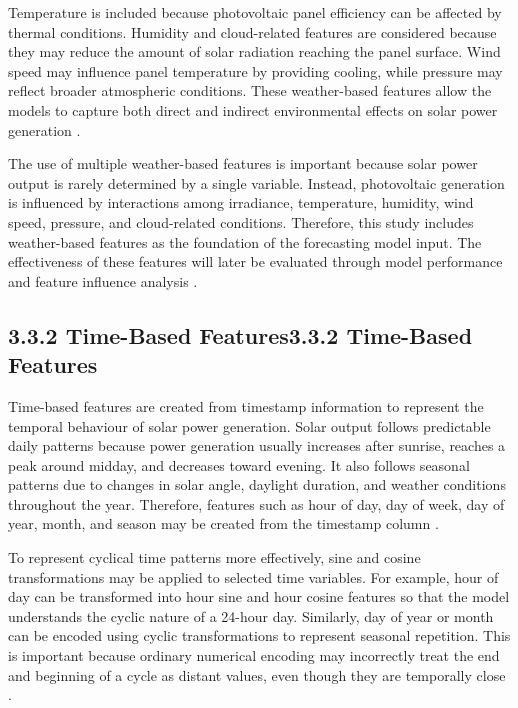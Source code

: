 Temperature is included because photovoltaic panel efficiency can be affected by thermal conditions. Humidity and cloud-related features are considered because they may reduce the amount of solar radiation reaching the panel surface. Wind speed may influence panel temperature by providing cooling, while pressure may reflect broader atmospheric conditions. These weather-based features allow the models to capture both direct and indirect environmental effects on solar power generation \parencite{Eren2025, Alhassan2025, Duvuru2026}.

The use of multiple weather-based features is important because solar power output is rarely determined by a single variable. Instead, photovoltaic generation is influenced by interactions among irradiance, temperature, humidity, wind speed, pressure, and cloud-related conditions. Therefore, this study includes weather-based features as the foundation of the forecasting model input. The effectiveness of these features will later be evaluated through model performance and feature influence analysis \parencite{JnanaVarshitha2025, Bakht2025, Pongphaw2025}.

\subsection{3.3.2 Time-Based Features3.3.2 Time-Based Features}

Time-based features are created from timestamp information to represent the temporal behaviour of solar power generation. Solar output follows predictable daily patterns because power generation usually increases after sunrise, reaches a peak around midday, and decreases toward evening. It also follows seasonal patterns due to changes in solar angle, daylight duration, and weather conditions throughout the year. Therefore, features such as hour of day, day of week, day of year, month, and season may be created from the timestamp column \parencite{TsaiLo2025, CarvalhoJunior2025, Eren2025}.

To represent cyclical time patterns more effectively, sine and cosine transformations may be applied to selected time variables. For example, hour of day can be transformed into hour sine and hour cosine features so that the model understands the cyclic nature of a 24-hour day. Similarly, day of year or month can be encoded using cyclic transformations to represent seasonal repetition. This is important because ordinary numerical encoding may incorrectly treat the end and beginning of a cycle as distant values, even though they are temporally close \parencite{TsaiLo2025, JnanaVarshitha2025, Duvuru2026}.

